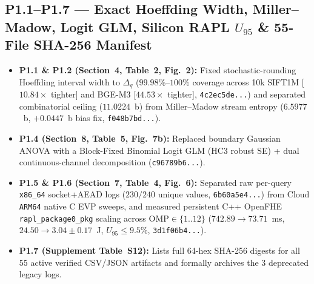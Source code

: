 \documentclass[10pt]{article}
\begin{document}
\subsection*{P1.1--P1.7 --- Exact Hoeffding Width, Miller--Madow, Logit GLM, Silicon RAPL $U_{95}$ \& 55-File SHA-256 Manifest}
\begin{itemize}[leftmargin=1.4em]
    \item \textbf{P1.1 \& P1.2 (Section~4, Table~2, Fig.~2):} Fixed stochastic-rounding Hoeffding interval width to $\Delta_q$ ($99.98\%$--$100\%$ coverage across 10k SIFT1M [$10.84\times$ tighter] and BGE-M3 [$44.53\times$ tighter], \texttt{4c2ec5de...}) and separated combinatorial ceiling ($11.0224$~b) from Miller--Madow stream entropy ($6.5977$~b, $+0.0447$~b bias fix, \texttt{f048b7bd...}).
    \item \textbf{P1.4 (Section~8, Table~5, Fig.~7b):} Replaced boundary Gaussian ANOVA with a Block-Fixed Binomial Logit GLM (HC3 robust SE) + dual continuous-channel decomposition (\texttt{c96789b6...}).
    \item \textbf{P1.5 \& P1.6 (Section~7, Table~4, Fig.~6):} Separated raw per-query \texttt{x86\_64} socket+AEAD logs ($230/240$ unique values, \texttt{6b60a5e4...}) from Cloud \texttt{ARM64} native C EVP sweeps, and measured persistent C++ OpenFHE \texttt{rapl\_package0\_pkg} scaling across $\mathrm{OMP}\in\{1..12\}$ ($742.89\rightarrow 73.71$~ms, $24.50\rightarrow 3.04\pm 0.17$~J, $U_{95}\le 9.5\%$, \texttt{3d1f06b4...}).
    \item \textbf{P1.7 (Supplement Table~S12):} Lists full 64-hex SHA-256 digests for all 55 active verified CSV/JSON artifacts and formally archives the 3 deprecated legacy logs.
\end{itemize}
\end{document}
